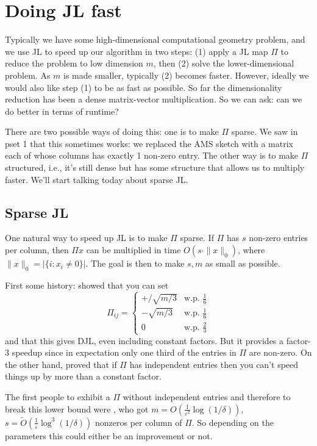 \documentclass[11pt]{article}
\newcommand{\ep}{\varepsilon}
\begin{document}
\section{Doing JL fast}
Typically we have some high-dimensional computational geometry problem, and we use JL to speed up our algorithm in two steps: (1) apply a JL map $\Pi$ to reduce the problem to low dimension $m$, then (2) solve the lower-dimensional problem. As $m$ is made smaller, typically (2) becomes faster. However, ideally we would also like step (1) to be as fast as possible. So far the dimensionality reduction has been a dense matrix-vector multiplication. So we can ask: can we do better in terms of runtime?

There are two possible ways of doing this: one is to make $\Pi$ sparse. We saw in pset 1 that this sometimes works: we replaced the AMS sketch with a matrix each of whose columns has exactly 1 non-zero entry. The other way is to make $\Pi$ structured, i.e., it's still dense but has some structure that allows us to multiply faster. We'll start talking today about sparse JL.

\subsection{Sparse JL}
One natural way to speed up JL is to make $\Pi$ sparse. If $\Pi$ has $s$ non-zero entries per column, then $\Pi x$ can be multiplied in time $O(s\cdot\|x\|_0)$, where $\|x\|_0 = |\{i : x_i \neq 0\}|$. The goal is then to make $s, m$ as small as possible.

First some history: 
\cite{Achlioptas} showed that you can set
\[
\Pi_{ij} = \begin{cases} 
      +/\sqrt{m/3} & \text{w.p. } \frac{1}{6} \\
      -\sqrt{m/3} & \text{w.p. } \frac{1}{6} \\
      0 & \text{w.p. } \frac{2}{3}
   \end{cases}
\]
and that this gives DJL, even including constant factors. But it provides a factor-3 speedup since in expectation only one third of the entries in $\Pi$ are non-zero. On the other hand, \cite{M2008} proved that if $\Pi$ has independent entries then you can't speed things up by more than a constant factor.

The first people to exhibit a $\Pi$ without independent entries and therefore to break this lower bound were \cite{DKS2010}, who got $m = O(\frac{1}{\ep^2} \log(1/\delta))$, $s = \tilde O(\frac{1}{\ep} \log^3(1/\delta))$ nonzeros per column of $\Pi$. So depending on the parameters this could either be an improvement or not.
\end{document}
